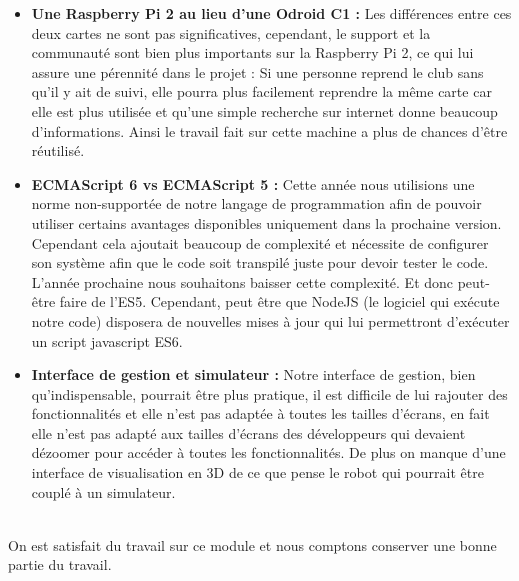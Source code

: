 	\begin{itemize}
		\item \textbf{Une Raspberry Pi 2 au lieu d'une Odroid C1 :} Les différences entre ces deux cartes ne sont pas significatives, cependant, le support et la communauté sont bien plus importants sur la Raspberry Pi 2, ce qui lui assure une pérennité dans le projet : Si une personne reprend le club sans qu'il y ait de suivi, elle pourra plus facilement reprendre la même carte car elle est plus utilisée et qu'une simple recherche sur internet donne beaucoup d'informations. Ainsi le travail fait sur cette machine a plus de chances d'être réutilisé.
		\item \textbf{ECMAScript 6 vs ECMAScript 5 :} Cette année nous utilisions une norme non-supportée de notre langage de programmation afin de pouvoir utiliser certains avantages disponibles uniquement dans la prochaine version. Cependant cela ajoutait beaucoup de complexité et nécessite de configurer son système afin que le code soit transpilé juste pour devoir tester le code. L'année prochaine nous souhaitons baisser cette complexité. Et donc peut-être faire de l'ES5. Cependant, peut être que NodeJS (le logiciel qui exécute notre code) disposera de nouvelles mises à jour qui lui permettront d'exécuter un script javascript ES6.
		\item \textbf{Interface de gestion et simulateur :} Notre interface de gestion, bien qu'indispensable, pourrait être plus pratique, il est difficile de lui rajouter des fonctionnalités et elle n'est pas adaptée à toutes les tailles d'écrans, en fait elle n'est pas adapté aux tailles d'écrans des développeurs qui devaient dézoomer pour accéder à toutes les fonctionnalités. De plus on manque d'une interface de visualisation en 3D de ce que pense le robot qui pourrait être couplé à un simulateur.
	\end{itemize}
	\ \\
	On est satisfait du travail sur ce module et nous comptons conserver une bonne partie du travail.